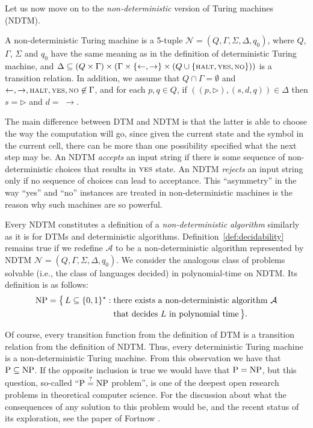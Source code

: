 Let us now move on to the \emph{non-deterministic} version of Turing machines (NDTM).

\begin{definition}
    A non-deterministic Turing machine is a 5-tuple $\mathcal{N}=(Q,\Gamma,\Sigma,\Delta,q_0)$, where $Q$, $\Gamma$, $\Sigma$ and $q_0$ have the same meaning as in the definition of deterministic Turing machine, and $\Delta\subseteq(Q\times\Gamma)\times(\Gamma\times\{\leftarrow,\rightarrow\}\times(Q\cup\{{\scriptstyle\rm HALT},{\scriptstyle\rm YES},{\scriptstyle\rm NO}\}))$ is a transition relation.
	In addition, we assume that $Q\cap\Gamma=\emptyset$ and $\leftarrow,\rightarrow,{\scriptstyle\rm HALT},{\scriptstyle\rm YES},{\scriptstyle\rm NO}\not\in\Gamma$, and for each $p,q\in Q$, if $((p,\rhd),(s,d,q))\in\Delta$ then $s=\rhd$ and $d=\;\rightarrow$.
\end{definition}

The main difference between DTM and NDTM is that the latter is able to choose the way the computation will go, since given the current state and the symbol in the current cell, there can be more than one possibility specified what the next step may be.
An NDTM \emph{accepts} an input string if there is some sequence of non-deterministic choices that results in ${\scriptstyle\rm YES}$ state.
An NDTM \emph{rejects} an input string only if no sequence of choices can lead to acceptance.
This ``asymmetry'' in the way ``yes'' and ``no'' instances are treated in non-deterministic machines is the reason why such machines are so powerful.

Every NDTM constitutes a definition of a \emph{non-deterministic algorithm} similarly as it is for DTMs and deterministic algorithms.
Definition~\ref{def:decidability} remains true if we redefine $\mathcal{A}$ to be a non-deterministic algorithm represented by NDTM $\mathcal{N}=(Q,\Gamma,\Sigma,\Delta,q_0)$.
We consider the analogous class of problems solvable (i.e., the class of languages decided) in polynomial-time on NDTM.
Its definition is as follows:
\begin{align*}
    \textnormal{NP} = \bigl\{\,L\subseteq\{0,1\}^*:\;&\text{there exists a non-deterministic algorithm $\mathcal{A}$} \\
	& \text{that decides $L$ in polynomial time}\,\bigr\}.
\end{align*}

Of course, every transition function from the definition of DTM is a transition relation from the definition of NDTM.
Thus, every deterministic Turing machine is a non-deterministic Turing machine.
From this observation we have that $\textnormal{P}\subseteq\textnormal{NP}$.
If the opposite inclusion is true we would have that $\textnormal{P}=\textnormal{NP}$, but this question, so-called ``$\textnormal{P}\stackrel{?}{=}\textnormal{NP}$ problem'', is one of the deepest open research problems in theoretical computer science.
For the discussion about what the consequences of any solution to this problem would be, and the recent status of its exploration, see the paper of Fortnow \cite{fortnow}.

